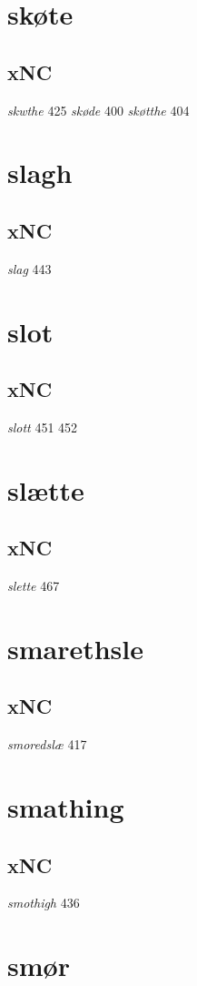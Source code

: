 \documentclass[a4paper,twocolumn]{article}
\begin{document}
\section{skøte}
\label{sec:org411050b}
\subsection{xNC}
\label{sec:org6571a95}
\emph{skwthe} 425 \emph{skøde} 400 \emph{skøtthe} 404 
\section{slagh}
\label{sec:orgd100c28}
\subsection{xNC}
\label{sec:org4dec7d9}
\emph{slag} 443 
\section{slot}
\label{sec:orgdf3bb39}
\subsection{xNC}
\label{sec:orgf9477e2}
\emph{slott} 451 452 
\section{slætte}
\label{sec:org649ad3c}
\subsection{xNC}
\label{sec:org2b87d43}
\emph{slette} 467 
\section{smarethsle}
\label{sec:orgf117225}
\subsection{xNC}
\label{sec:org92db948}
\emph{smoredslæ} 417 
\section{smathing}
\label{sec:orga34dfbb}
\subsection{xNC}
\label{sec:orge78e96a}
\emph{smothigh} 436 
\section{smør}
\label{sec:orgd29234f}
\end{document}
